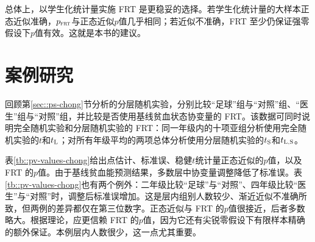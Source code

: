 总体上，以学生化统计量实施 FRT 是更稳妥的选择。若学生化统计量的大样本正态近似准确，$p_{\textsc{frt}}$与正态近似$p$值几乎相同；若近似不准确，FRT 至少仍保证强零假设下$p$值有效。这就是本书的建议。 



\section{案例研究}
\label{sec::case-study-chong}

 

回顾第\ref{sec::ps-chong}节分析的\citet{chong2016iron}分层随机实验，分别比较“足球”组与“对照”组、“医生”组与“对照”组，并比较是否使用基线贫血状态协变量的 FRT。该数据可同时说明完全随机实验和分层随机实验的 FRT：同一年级内的十项亚组分析使用完全随机实验的$t$和$t_\textsc{L}$；对所有年级平均的两项总体分析使用分层随机实验的$t_\textsc{S}$和$t_\textsc{L,S}$。 

表\ref{tb::pv-values-chong}给出点估计、标准误、稳健$t$统计量正态近似的$p$值，以及 FRT 的$p$值。由于基线贫血能预测结果，多数层中协变量调整降低了标准误。表\ref{tb::pv-values-chong}也有两个例外：二年级比较“足球”与“对照”、四年级比较“医生”与“对照”时，调整后标准误增加。这是层内组别人数较少、渐近近似不准确所致，但两例的差异都仅在第三位数字。正态近似与 FRT 的$p$值很接近，后者多数略大。根据理论，应更信赖 FRT 的$p$值，因为它还有尖锐零假设下有限样本精确的额外保证。本例层内人数很少，这一点尤其重要。 

